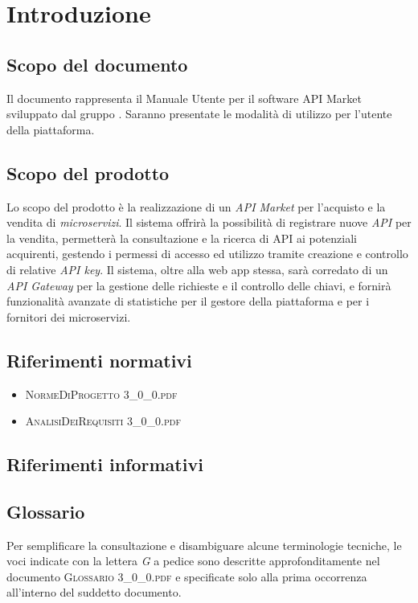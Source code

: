 \newpage
\section{Introduzione}

\subsection{Scopo del documento}
Il documento rappresenta il Manuale Utente per il software API Market sviluppato dal gruppo \gruppo. Saranno presentate le modalità di utilizzo per l'utente della piattaforma.

\subsection{Scopo del prodotto}
Lo scopo del prodotto è la realizzazione di un \textit{API Market} per l'acquisto e la vendita di \textit{microservizi}. Il sistema offrirà la possibilità di registrare nuove \textit{API} per la vendita, permetterà la consultazione e la ricerca di API ai potenziali acquirenti, gestendo i permessi di accesso ed utilizzo tramite creazione e controllo di relative \textit{API key}. Il sistema, oltre alla web app stessa, sarà corredato di un \textit{API Gateway} per la gestione delle richieste e il controllo delle chiavi, e fornirà funzionalità avanzate di statistiche per il gestore della piattaforma e per i fornitori dei microservizi.

\subsection{Riferimenti normativi}
\begin{itemize}
	\item \textsc{NormeDiProgetto 3\_0\_0.pdf}
	\item \textsc{AnalisiDeiRequisiti 3\_0\_0.pdf}
\end{itemize}


\subsection{Riferimenti informativi}


\subsection{Glossario}
Per semplificare la consultazione e disambiguare alcune terminologie tecniche, le voci indicate con la lettera \textit{G} a pedice sono descritte approfonditamente nel documento \textsc{Glossario 3\_0\_0.pdf} e specificate solo alla prima occorrenza all'interno del suddetto documento.